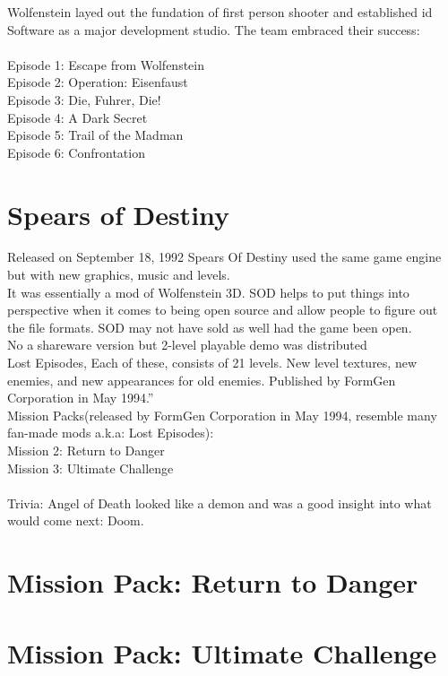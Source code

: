 \documentclass[book.tex]{subfiles}
\begin{document}
Wolfenstein layed out the fundation of first person shooter and established id Software as a major development studio. The team embraced their success:\\
\\
Episode 1: Escape from Wolfenstein\\
Episode 2: Operation: Eisenfaust\\
Episode 3: Die, Fuhrer, Die!\\
Episode 4: A Dark Secret\\
Episode 5: Trail of the Madman\\
Episode 6: Confrontation\\

\section{Spears of Destiny}
Released on September 18, 1992 Spears Of Destiny used the same game engine but with new graphics, music and levels.\\
It was essentially a mod of Wolfenstein 3D. SOD helps to put things into perspective when it comes to being open source and allow people to figure out the file formats. SOD may not have sold as well had the game been open.\\
No a shareware version  but  2-level playable demo was distributed\\
Lost Episodes, Each of these, consists of 21 levels. New level textures, new enemies, and new appearances for old enemies. Published by FormGen Corporation in May 1994.''
\\
Mission Packs(released by FormGen Corporation in May 1994, resemble many fan-made mods a.k.a: Lost Episodes):\\
Mission 2: Return to Danger\\
Mission 3: Ultimate Challenge\\
\\
Trivia: Angel of Death looked like a demon and was a good insight into what would come next: Doom.
\section{Mission Pack: Return to Danger}
\section{Mission Pack: Ultimate Challenge}
\end{document}
